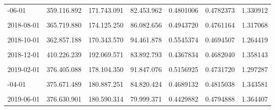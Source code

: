 \documentclass[12pt]{article}
\begin{document}
\begin{longtable}[t]{llllrrr}
\addlinespace
2018-06-01 & 359.116.892 & 171.743.091 & 82.453.962 & 0.4801006 & 0.4782373 & 1.330912\\
\cellcolor{gray!10}{2018-07-01} & \cellcolor{gray!10}{356.789.583} & \cellcolor{gray!10}{170.376.496} & \cellcolor{gray!10}{88.925.463} & \cellcolor{gray!10}{0.5219350} & \cellcolor{gray!10}{0.4775265} & \cellcolor{gray!10}{1.295821}\\
2018-08-01 & 365.719.880 & 174.125.250 & 86.082.656 & 0.4943720 & 0.4761164 & 1.317068\\
\cellcolor{gray!10}{2018-09-01} & \cellcolor{gray!10}{371.430.695} & \cellcolor{gray!10}{176.292.220} & \cellcolor{gray!10}{84.268.431} & \cellcolor{gray!10}{0.4780043} & \cellcolor{gray!10}{0.4746302} & \cellcolor{gray!10}{1.329354}\\
2018-10-01 & 362.857.188 & 170.343.570 & 94.461.878 & 0.5545374 & 0.4694507 & 1.264419\\
\addlinespace
\cellcolor{gray!10}{2018-11-01} & \cellcolor{gray!10}{376.198.825} & \cellcolor{gray!10}{176.328.775} & \cellcolor{gray!10}{79.388.780} & \cellcolor{gray!10}{0.4502316} & \cellcolor{gray!10}{0.4687117} & \cellcolor{gray!10}{1.347133}\\
2018-12-01 & 410.226.239 & 192.069.571 & 83.892.793 & 0.4367834 & 0.4682040 & 1.358143\\
\cellcolor{gray!10}{2019-01-01} & \cellcolor{gray!10}{372.836.696} & \cellcolor{gray!10}{172.986.831} & \cellcolor{gray!10}{79.255.737} & \cellcolor{gray!10}{0.4581605} & \cellcolor{gray!10}{0.4639748} & \cellcolor{gray!10}{1.335827}\\
2019-02-01 & 376.405.088 & 178.104.350 & 91.847.076 & 0.5156925 & 0.4731720 & 1.297287\\
\cellcolor{gray!10}{2019-03-01} & \cellcolor{gray!10}{377.380.908} & \cellcolor{gray!10}{180.041.402} & \cellcolor{gray!10}{89.402.062} & \cellcolor{gray!10}{0.4965639} & \cellcolor{gray!10}{0.4770814} & \cellcolor{gray!10}{1.316101}\\
\addlinespace
2019-04-01 & 375.671.489 & 180.887.251 & 84.820.424 & 0.4689132 & 0.4815038 & 1.343581\\
\cellcolor{gray!10}{2019-05-01} & \cellcolor{gray!10}{371.571.210} & \cellcolor{gray!10}{176.189.112} & \cellcolor{gray!10}{82.493.849} & \cellcolor{gray!10}{0.4682120} & \cellcolor{gray!10}{0.4741732} & \cellcolor{gray!10}{1.337184}\\
2019-06-01 & 376.630.901 & 180.590.314 & 79.999.371 & 0.4429882 & 0.4794888 & 1.364407\\

\end{longtable}
\end{document}
